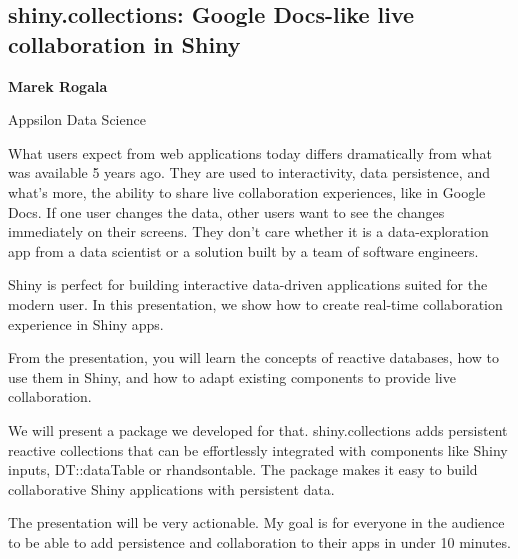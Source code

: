 \documentclass[\main/boa.tex]{subfiles}
\begin{document}
\subsection{shiny.collections: Google Docs-like live collaboration in Shiny}

\begin{minipage}{0.915\textwidth}
	\centering
  {\bf {} Marek Rogala}
\end{minipage}

\vskip 0.3cm

\begin{affiliations}
\begin{minipage}{0.915\textwidth}
\centering
Appsilon Data Science \\[-2pt]
\end{minipage}
\end{affiliations}

\vskip 0.8cm

 What users expect from web applications today differs dramatically from what was available 5 years ago. They are used to interactivity, data persistence, and what’s more, the ability to share live collaboration experiences, like in Google Docs. If one user changes the data, other users want to see the changes immediately on their screens. They don’t care whether it is a data-exploration app from a data scientist or a solution built by a team of software engineers.
 
 Shiny is perfect for building interactive data-driven applications suited for the modern user. In this presentation, we show how to create real-time collaboration experience in Shiny apps.
 
 From the presentation, you will learn the concepts of reactive databases, how to use them in Shiny, and how to adapt existing components to provide live collaboration.
 
 We will present a package we developed for that. shiny.collections adds persistent reactive collections that can be effortlessly integrated with components like Shiny inputs, DT::dataTable or rhandsontable. The package makes it easy to build collaborative Shiny applications with persistent data.
 
 The presentation will be very actionable. My goal is for everyone in the audience to be able to add persistence and collaboration to their apps in under 10 minutes.
\end{document}
